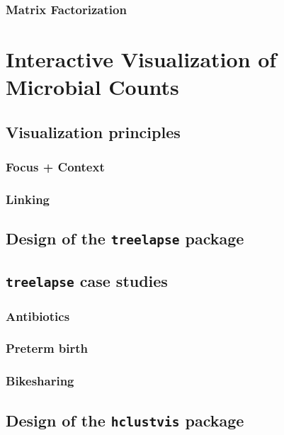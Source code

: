 \documentclass{report}
\begin{document}
\subsection{Matrix Factorization}

\chapter{Interactive Visualization of Microbial Counts}

\section{Visualization principles}

\subsection{Focus + Context}

\subsection{Linking}

\section{Design of the \texttt{treelapse} package}

\section{\texttt{treelapse} case studies}

\subsection{Antibiotics}

\subsection{Preterm birth}

\subsection{Bikesharing}

\section{Design of the \texttt{hclustvis} package}
\end{document}
